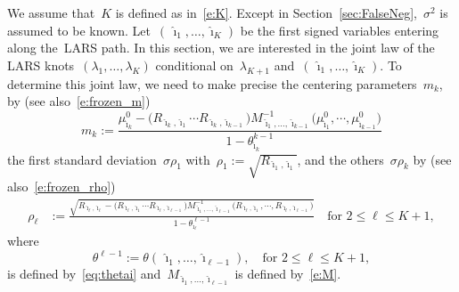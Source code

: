 \documentclass[final,numbib]{imaiai}%
\numberwithin{equation}{section}
\def\eq{\begin{equation}}
\def\qe{\end{equation}}
\renewcommand{\bar}{\overline}
\renewcommand{\hat}{\widehat}
\newcommand{\<}{\langle}
\renewcommand{\>}{\rangle}
\newcommand{\1}{\mathds{1}}
\begin{document}
{We assume that~$K$ is defined as in~\eqref{e:K}.
Except in Section~\ref{sec:FalseNeg},~$\sigma^2$ is  assumed to  be known.
Let~$(\,\hat \imath_1,\ldots, \hat \imath_K)$ be the first signed variables entering along the~LARS path.
In this section, we are interested in the joint law of the LARS knots~$(\lambda_1,\ldots, \lambda_K)$ conditional on~$\lambda_{K+1}$ and~$(\,\hat \imath_1,\ldots, \hat \imath_K)$.
To determine this joint law, we need to make precise the centering parameters~$m_k$, by (see also~\eqref{e:frozen_m})
\eq
\label{eq:def_mu_proj}
m_k:=
\frac{
\mu^0_{\hat \imath_k}- \big(R_{\hat \imath_k,\hat \imath_1} \cdots R_{\hat \imath_{k},\hat \imath_{k-1}}  \big)
M^{-1}_{\hat \imath_1,\ldots, \hat \imath_{k-1}}
\big(\mu^0_{\hat \imath_1} ,\cdots ,\mu^0_{\hat \imath_{k-1}} \big)
}{1-\theta_{\hat \imath_{k}}^{k-1}}
\qe
the first standard deviation~$\sigma\rho_1$ with~$\rho_1:=\sqrt{R_{\hat \imath_1,\hat \imath_1}}$, and the others~$\sigma\rho_k$ by
(see also~\eqref{e:frozen_rho})
\begin{align}
\rho_\ell
&
:=\frac{ \sqrt{ R_{\hat \imath_\ell,\hat \imath_\ell} - \big(R_{\hat \imath_\ell,\hat \imath_1} \cdots R_{\hat \imath_{\ell},\hat \imath_{\ell-1}}  \big)M^{-1}_{\hat \imath_1,\ldots, \hat \imath_{\ell-1}} \big(R_{\hat \imath_\ell,\hat \imath_1} ,\cdots ,R_{\hat \imath_{\ell},\hat \imath_{\ell-1}} \big)}} { 1-\theta^{\ell-1}_{\hat \imath_\ell}}
\quad \text{for }2\leq \ell\leq K+1,
\label{eq:def_rho}
\end{align}
where~
\[
\theta^{\ell-1}:=\theta(\,\hat \imath_1,\ldots, \hat \imath_{\ell-1}),\quad \text{for }2\leq \ell\leq K+1, 
\]
is defined by~\eqref{eq:thetai} and~$M_{\hat \imath_1,\ldots, \hat \imath_{\ell-1}}$ is defined by~\eqref{e:M}.



}
\end{document}
